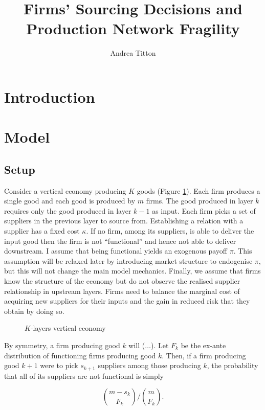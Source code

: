 \documentclass[american, abstract=on]{scrartcl}
\author{Andrea Titton}
\title{Firms' Sourcing Decisions and\\ Production Network Fragility}
\newcommand{\inputTikZ}[2]{%
      \scalebox{#1}{}  
    }
\theoremstyle{plain}
\begin{document}
\maketitle
\section{Introduction}

\section{Model}

\subsection{Setup}

Consider a vertical economy producing $K$ goods (Figure \ref{fig:vertical-economy-diagram}). Each firm produces a single good and each good is produced by $m$ firms. The good produced in layer $k$ requires only the good produced in layer $k - 1$ as input. Each firm picks a set of suppliers in the previous layer to source from. Establishing a relation with a supplier has a fixed cost $\kappa$. If no firm, among its suppliers, is able to deliver the input good then the firm is not ``functional'' and hence not able to deliver downstream. I assume that being functional yields an exogenous payoff $\pi$. This assumption will be relaxed later by introducing market structure to endogenise $\pi$, but this will not change the main model mechanics. Finally, we assume that firms know the structure of the economy but do not observe the realised supplier relationship in upstream layers. Firms need to balance the marginal cost of acquiring new suppliers for their inputs and the gain in reduced risk that they obtain by doing so. 

\begin{figure}[H]
  \centering
  \inputTikZ{0.5}{../diagrams/model-presentation.tikz} 
  \caption{$K$-layers vertical economy}
  \label{fig:vertical-economy-diagram}
\end{figure}

By symmetry, a firm producing good $k$ will ($\ldots$). Let $F_k$ be the ex-ante distribution of functioning firms producing good $k$. Then, if a firm producing good $k + 1$ were to pick $s_{k + 1}$ suppliers among those producing $k$, the probability that all of its suppliers are not functional is simply

\begin{equation}
  \binom{m - s_k}{F_k} \Bigg/ \binom{m}{F_k}. 
\end{equation}
\end{document}
